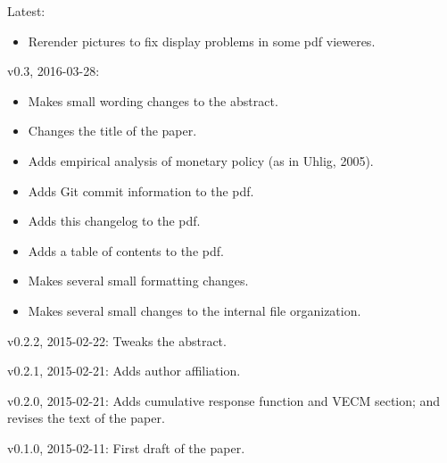 \begin{description}
\item{Latest:}
  \begin{itemize}[noitemsep]
  \item Rerender pictures to fix display problems in some pdf vieweres.
  \end{itemize}

\item{v0.3, 2016-03-28:}
  \begin{itemize}[noitemsep]
  \item Makes small wording changes to the abstract.
  \item Changes the title of the paper.
  \item Adds empirical analysis of monetary policy (as in Uhlig, 2005).
  \item Adds Git commit information to the pdf.
  \item Adds this changelog to the pdf.
  \item Adds a table of contents to the pdf.
  \item Makes several small formatting changes.
  \item Makes several small changes to the internal file organization.
  \end{itemize}

\item{v0.2.2, 2015-02-22:} Tweaks the abstract.

\item{v0.2.1, 2015-02-21:} Adds author affiliation.

\item{v0.2.0, 2015-02-21:} Adds cumulative response function and VECM section; and
  revises the text of the paper.

\item{v0.1.0, 2015-02-11:} First draft of the paper.
\end{description}

